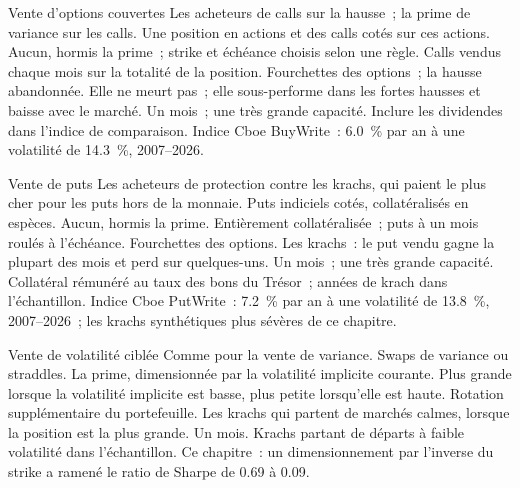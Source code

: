 \begin{strategyfile}{Vente d'options couvertes}\label{strat:s2:harvesting-the-variance-risk-premium:overwrite}
 Les acheteurs de calls sur la hausse~; la prime de variance sur les calls.
 Une position en actions et des calls cotés sur ces actions.
 Aucun, hormis la prime~; strike et échéance choisis selon une règle.
 Calls vendus chaque mois sur la totalité de la position.
 Fourchettes des options~; la hausse abandonnée.
 Elle ne meurt pas~; elle sous-performe dans les fortes hausses et baisse avec le marché.
 Un mois~; une très grande capacité.
 Inclure les dividendes dans l'indice de comparaison.
 Indice Cboe BuyWrite~: 6.0~\% par an à une volatilité de 14.3~\%, 2007--2026.
\end{strategyfile}

\begin{strategyfile}{Vente de puts}\label{strat:s2:harvesting-the-variance-risk-premium:putwrite}
 Les acheteurs de protection contre les krachs, qui paient le plus cher pour les puts hors de la monnaie.
 Puts indiciels cotés, collatéralisés en espèces.
 Aucun, hormis la prime.
 Entièrement collatéralisée~; puts à un mois roulés à l'échéance.
 Fourchettes des options.
 Les krachs~: le put vendu gagne la plupart des mois et perd sur quelques-uns.
 Un mois~; une très grande capacité.
 Collatéral rémunéré au taux des bons du Trésor~; années de krach dans l'échantillon.
 Indice Cboe PutWrite~: 7.2~\% par an à une volatilité de 13.8~\%, 2007--2026~; les krachs synthétiques plus sévères de ce chapitre.
\end{strategyfile}

\begin{strategyfile}{Vente de volatilité ciblée}\label{strat:s2:harvesting-the-variance-risk-premium:voltarget}
 Comme pour la vente de variance.
 Swaps de variance ou straddles.
 La prime, dimensionnée par la volatilité implicite courante.
 Plus grande lorsque la volatilité implicite est basse, plus petite lorsqu'elle est haute.
 Rotation supplémentaire du portefeuille.
 Les krachs qui partent de marchés calmes, lorsque la position est la plus grande.
 Un mois.
 Krachs partant de départs à faible volatilité dans l'échantillon.
 Ce chapitre~: un dimensionnement par l'inverse du strike a ramené le ratio de Sharpe de 0.69 à 0.09.
\end{strategyfile}

